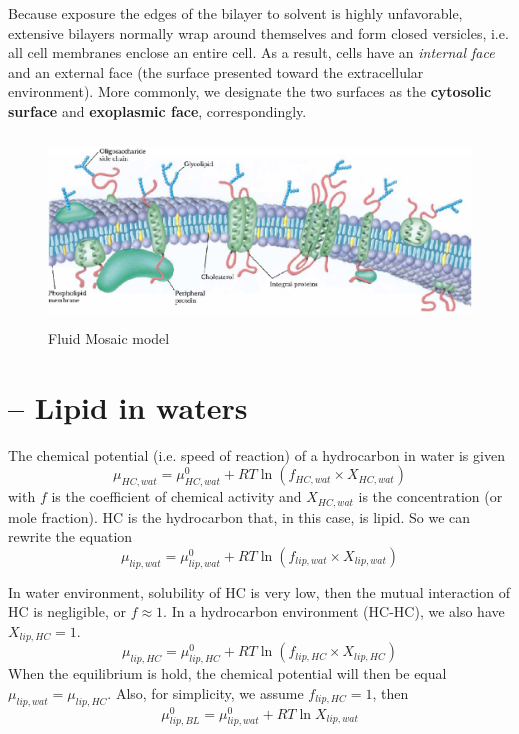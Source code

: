 Because exposure the edges of the bilayer to solvent is highly
unfavorable, extensive bilayers normally wrap around themselves and
form closed versicles, i.e. all cell membranes enclose an entire cell.
As a result, cells have an {\it internal face} and an external face
(the surface presented toward the extracellular environment). More
commonly, we designate the two surfaces as the {\bf cytosolic surface}
and {\bf exoplasmic face}, correspondingly.  
\begin{figure}[hbt]
  \centerline{\includegraphics[height=5cm,
    angle=0]{./images/mosaic_model.eps}}
 \caption{Fluid Mosaic model}
\label{fig:mosaic_fluid}
\end{figure}

\section{-- Lipid in waters}
\label{sec:lipid-in-water}

The chemical potential (i.e. speed of reaction) of a hydrocarbon in
water is given
\begin{equation}
  \mu_{HC,wat} = \mu_{HC,wat}^0 + RT \ln(f_{HC,wat}\times X_{HC,wat})
\end{equation}
with $f$ is the coefficient of chemical activity and $X_{HC,wat}$ is
the concentration (or mole fraction). HC is the hydrocarbon that,
in this case, is lipid. So we can rewrite the equation
\begin{equation}
  \mu_{lip,wat} = \mu_{lip,wat}^0 + RT \ln(f_{lip,wat}\times X_{lip,wat})
\end{equation}

In water environment, solubility of HC is very low, then the mutual
interaction of HC is negligible, or $f \approx 1$. 
In a hydrocarbon environment (HC-HC), we also have
$X_{lip, HC} = 1$.
\begin{equation}
  \mu_{lip,HC} = \mu_{lip,HC}^0 + RT \ln(f_{lip,HC}\times X_{lip,HC})
\end{equation}
When the equilibrium is hold, the chemical potential will then be
equal $\mu_{lip,wat} = \mu_{lip,HC}$. Also, for simplicity, we assume
$f_{lip,HC} = 1$, then
\begin{equation}
  \mu_{lip,BL}^0 = \mu_{lip,wat}^0 + RT \ln X_{lip,wat}
\end{equation}

